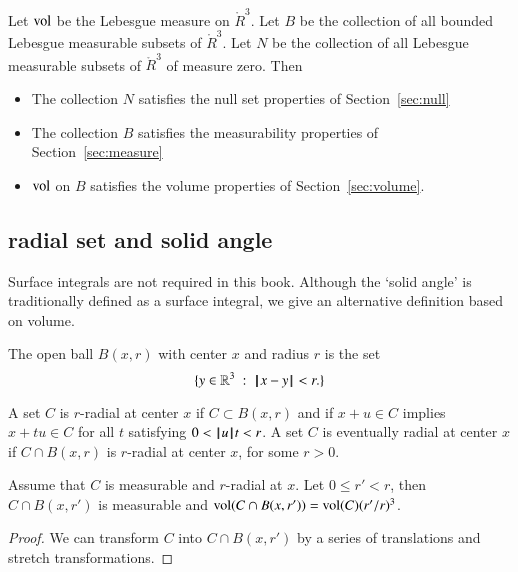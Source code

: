 \begin{lemma}  Let ${\operatorname{vol}}$ be the Lebesgue measure
on $\ring{R}^3$. Let $B$ be the collection of all bounded Lebesgue
measurable subsets of $\ring{R}^3$.  Let $N$ be the collection of all
Lebesgue measurable subsets of $\ring{R}^3$ of measure zero.
Then
\begin{itemize}
\item  The collection $N$ satisfies the null set properties of Section~\ref{sec:null}
\item The collection $B$ satisfies the measurability properties of Section~\ref{sec:measure}
\item  ${\operatorname{vol}}$ on $B$ satisfies the volume properties of Section~\ref{sec:volume}.  
\end{itemize}
\end{lemma}

\subsection{radial set and solid angle}\label{sec:solid}


Surface integrals are not required in this book.  Although
the `solid angle' is traditionally defined as a surface integral,
we give an alternative definition based on volume.


\begin{definition}  The open ball $B(x,r)$ with center $x$ and
radius $r$ is the set
    $$
    \{ y\in\mathbb{R}^3 \ :\  {\hskip0.1em|\hskip-0.15em|\hskip0.1em}x - y{\hskip0.1em|\hskip-0.15em|\hskip0.1em} < r.\}
    $$
\end{definition}



\begin{definition}[radial]
    A set $C$ is $r$-radial at center $x$ if  $C\subset B(x,r)$
    and if
        $x + u \in C$ implies
        $x + t u \in C$ for all $t$ satisfying $0 < {{\hskip0.1em|\hskip-0.15em|\hskip0.1em}u{\hskip0.1em|\hskip-0.15em|\hskip0.1em}} t < r$.
A set $C$ is eventually radial at center $x$ if $C\cap B(x,r)$ is
$r$-radial at center $x$, for some $r>0$.
\end{definition}

\begin{lemma}
Assume that $C$ is measurable and $r$-radial at $x$.  Let $0\le r'<r$,
then $C\cap B(x,r')$ is measurable and
${\operatorname{vol}}(C\cap B(x,r')) = {\operatorname{vol}}(C) (r'/r)^3$.
\end{lemma}

\begin{proof}  We can transform $C$ into $C\cap B(x,r')$ by
a series of translations and stretch transformations.
\end{proof}


